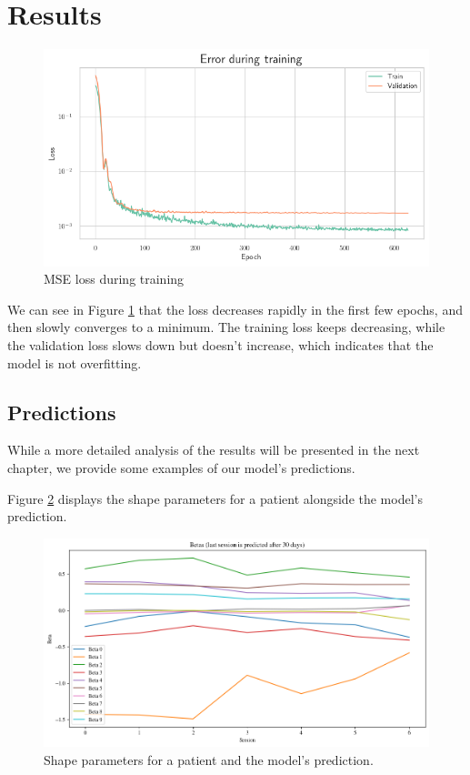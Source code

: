 \section{Results}

\begin{figure}[h]
    \centering
    \includegraphics[width=\textwidth]{files/loss}
    \caption{MSE loss during training}
    \label{fig:loss}
\end{figure}

We can see in Figure \ref{fig:loss} that the loss decreases rapidly in the
first few epochs, and then slowly converges to a minimum. The training loss
keeps decreasing, while the validation loss slows down but doesn't increase,
which indicates that the model is not overfitting.

\subsection{Predictions}

While a more detailed analysis of the results will be presented in the next
chapter, we provide some examples of our model's predictions.

Figure \ref{fig:predicted-betas} displays the shape parameters for a patient
alongside the model's prediction.

\begin{figure}[h]
    \centering
    \includegraphics[width=\textwidth]{files/predicted_betas}
    \caption{Shape parameters for a patient and the model's prediction.}
    \label{fig:predicted-betas}
\end{figure}

